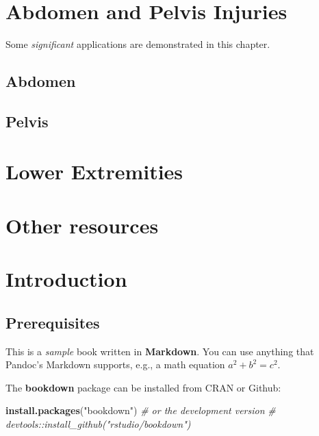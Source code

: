 \documentclass[]{book}
\newenvironment{Shaded}{\begin{snugshade}}{\end{snugshade}}
\newcommand{\CommentTok}[1]{\textcolor[rgb]{0.56,0.35,0.01}{\textit{#1}}}
\newcommand{\KeywordTok}[1]{\textcolor[rgb]{0.13,0.29,0.53}{\textbf{#1}}}
\newcommand{\NormalTok}[1]{#1}
\newcommand{\StringTok}[1]{\textcolor[rgb]{0.31,0.60,0.02}{#1}}
\begin{document}
\hypertarget{abdomen-and-pelvis-injuries}{%
\chapter{Abdomen and Pelvis Injuries}\label{abdomen-and-pelvis-injuries}}

Some \emph{significant} applications are demonstrated in this chapter.

\hypertarget{abdomen}{%
\section{Abdomen}\label{abdomen}}

\hypertarget{pelvis}{%
\section{Pelvis}\label{pelvis}}

\hypertarget{lower-extremities}{%
\chapter{Lower Extremities}\label{lower-extremities}}

\hypertarget{other-resources}{%
\chapter{Other resources}\label{other-resources}}

\hypertarget{introduction-1}{%
\chapter{Introduction}\label{introduction-1}}

\hypertarget{prerequisites-1}{%
\section{Prerequisites}\label{prerequisites-1}}

This is a \emph{sample} book written in \textbf{Markdown}. You can use anything that Pandoc's Markdown supports, e.g., a math equation \(a^2 + b^2 = c^2\).

The \textbf{bookdown} package can be installed from CRAN or Github:

\begin{Shaded}
\begin{Highlighting}[]
\KeywordTok{install.packages}\NormalTok{(}\StringTok{"bookdown"}\NormalTok{)}
\CommentTok{# or the development version}
\CommentTok{# devtools::install_github("rstudio/bookdown")}
\end{Highlighting}
\end{Shaded}
\end{document}
